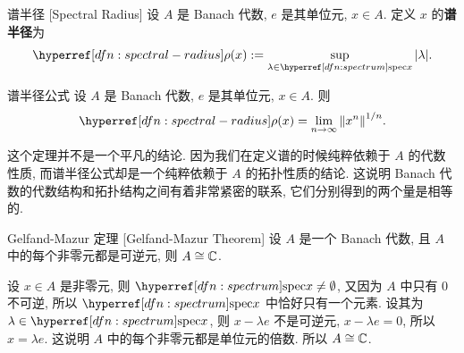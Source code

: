         \begin{dfn}
            {谱半径}
            [Spectral Radius]
            设 \(A\) 是 Banach 代数, \(e\) 是其单位元, \(x\in A\). 定义 \(x\) 的\textbf{谱半径}为
            \[\radius(x):=\sup_{\lambda\in\spec x}\abs{\lambda}.\]
        \end{dfn}

        \begin{thm}
            {谱半径公式}
            设 \(A\) 是 Banach 代数, \(e\) 是其单位元, \(x\in A\). 则
            \[\radius(x)=\lim_{n\to\infty}\norm{x^n}^{1/n}.\]
        \end{thm}

        \begin{rmk}
            [Dedicatia]
            这个定理并不是一个平凡的结论. 因为我们在定义谱的时候纯粹依赖于 \(A\) 的代数性质, 而谱半径公式却是一个纯粹依赖于 \(A\) 的拓扑性质的结论. 这说明 Banach 代数的代数结构和拓扑结构之间有着非常紧密的联系, 它们分别得到的两个量是相等的.
        \end{rmk}

        \begin{thm}
            {Gelfand-Mazur 定理}
            [Gelfand-Mazur Theorem]
            设 \(A\) 是一个 Banach 代数, 且 \(A\) 中的每个非零元都是可逆元, 则 \(A\cong\operatorname{\mathbb{C}}\).
        \end{thm}

        \begin{prf}
            设 \(x\in A\) 是非零元, 则 \(\spec x\neq\emptyset\), 又因为 \(A\) 中只有 0 不可逆, 所以 \(\spec x\) 中恰好只有一个元素. 设其为 \(\lambda\in\spec x\), 则 \(x-\lambda e\) 不是可逆元, \(x-\lambda e=0\), 所以 \(x=\lambda e\). 这说明 \(A\) 中的每个非零元都是单位元的倍数. 所以 \(A\cong\operatorname{\mathbb{C}}\).
        \end{prf}
